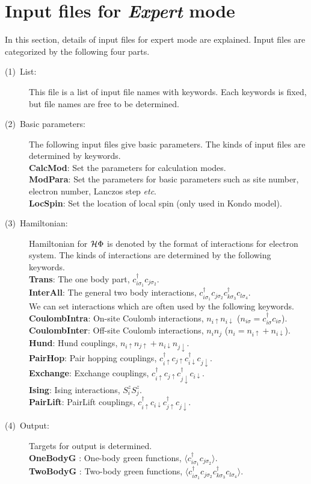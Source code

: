 \section{Input files for {\it Expert} mode}
\label{Ch:HowToExpert}
In this section, details of input files for expert mode are explained. Input files are categorized by the following four parts.
\begin{description}
\item[(1)~List:] This file is a list of input file names with keywords. Each keywords is fixed, but file names are free to be determined.  
\item[(2)~Basic parameters:] The following input files give basic parameters. 
The kinds of input files are determined by keywords. 
~\\{\bf CalcMod}: Set the parameters for calculation modes.
~\\{\bf ModPara}: Set the parameters for basic parameters such as site number, electron number, Lanczos step {\it etc}.
~\\{\bf LocSpin}: Set the location of local spin (only used in Kondo model). 
\item[(3)~Hamiltonian:] 
Hamiltonian for $\mathcal{H} \Phi$ is denoted by the format of interactions for electron system. 
The kinds of interactions are determined by the following keywords. 
~\\{\bf Trans}: The one body part, $c_{i\sigma_1}^{\dag}c_{j\sigma_2}$.
~\\{\bf InterAll}: The general two body interactions, $c_ {i \sigma_1}^{\dag}c_{j\sigma_2}c_{k \sigma_3}^{\dag}c_{l \sigma_4}$.
~\\We can set interactions which are often used by the following keywords. 
~\\{\bf CoulombIntra}: On-site Coulomb interactions, $n_ {i \uparrow}n_{i \downarrow}$ ($n_{i \sigma}=c_{i\sigma}^{\dag}c_{i\sigma}$).
~\\{\bf CoulombInter}: Off-site Coulomb interactions, $n_ {i}n_{j}$ ($n_i=n_{i\uparrow}+n_{i\downarrow}$).
~\\{\bf Hund}: Hund couplings, $n_{i\uparrow}n_{j\uparrow}+n_{i\downarrow}n_{j\downarrow}$.
~\\{\bf PairHop}: Pair hopping couplings, $c_ {i \uparrow}^{\dag}c_{j\uparrow}c_{i \downarrow}^{\dag}c_{j  \downarrow}$.
~\\{\bf Exchange}: Exchange couplings, $c_ {i \uparrow}^{\dag}c_{j\uparrow}c_{j \downarrow}^{\dag}c_{i  \downarrow}$.
~\\{\bf Ising}: Ising interactions, $S_i^z S_j^z$.
~\\{\bf PairLift}: PairLift couplings, $c_ {i \uparrow}^{\dag}c_{i\downarrow}c_{j \uparrow}^{\dag}c_{j \downarrow}$.
\item[(4)~Output:] Targets for output is determined.
~\\{\bf OneBodyG }: One-body green functions,  $\langle c^{\dagger}_{i\sigma_1}c_{j\sigma_2}\rangle$.
~\\{\bf TwoBodyG }: Two-body green functions,  $\langle c^{\dagger}_{i\sigma_1}c_{j\sigma_2}c^{\dagger}_{k \sigma_3}c_{l\sigma_4}\rangle$.
\end{description}

